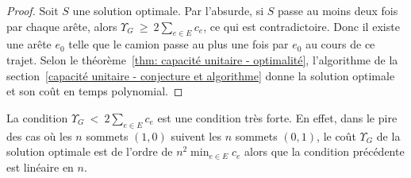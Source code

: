 \begin{proof}
Soit $S$ une solution optimale. Par l'absurde, si $S$ passe au moins deux fois par chaque arête, alors $\Upsilon_G~\ge~2\sum_{e \in E}c_e$, ce qui est contradictoire. Donc il existe une arête $e_0$ telle que le camion passe au plus une fois par $e_0$ au cours de ce trajet. Selon le théorème~\ref{thm: capacité unitaire - optimalité}, l'algorithme de la section~\ref{capacité unitaire - conjecture et algorithme} donne la solution optimale et son coût en temps polynomial.
\end{proof}

\begin{rmq}
La condition $\Upsilon_G~<~2\sum_{e \in E}c_e$ est une condition très forte. En effet, dans le pire des cas où les $n$ sommets $(1,0)$ suivent les $n$ sommets $(0,1)$, le coût $\Upsilon_G$ de la solution optimale est de l'ordre de $n^2\min_{e \in E}c_e$ alors que la condition précédente est linéaire en $n$.
\end{rmq}